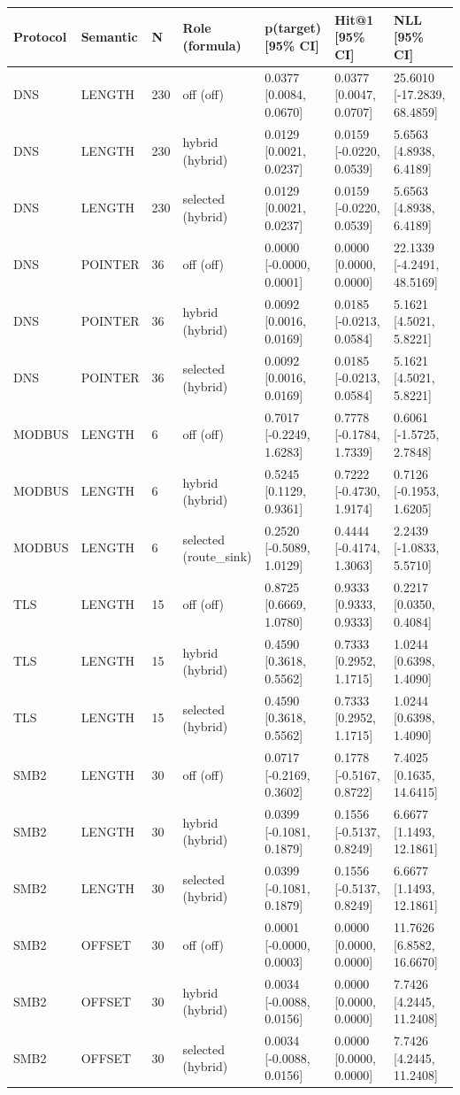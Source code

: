 \begin{tabular}{lllllll}
\hline
Protocol & Semantic & N & Role (formula) & p(target) [95\% CI] & Hit@1 [95\% CI] & NLL [95\% CI] \\
\hline
DNS & LENGTH & 230 & off (off) & 0.0377 [0.0084, 0.0670] & 0.0377 [0.0047, 0.0707] & 25.6010 [-17.2839, 68.4859] \\
DNS & LENGTH & 230 & hybrid (hybrid) & 0.0129 [0.0021, 0.0237] & 0.0159 [-0.0220, 0.0539] & 5.6563 [4.8938, 6.4189] \\
DNS & LENGTH & 230 & selected (hybrid) & 0.0129 [0.0021, 0.0237] & 0.0159 [-0.0220, 0.0539] & 5.6563 [4.8938, 6.4189] \\
DNS & POINTER & 36 & off (off) & 0.0000 [-0.0000, 0.0001] & 0.0000 [0.0000, 0.0000] & 22.1339 [-4.2491, 48.5169] \\
DNS & POINTER & 36 & hybrid (hybrid) & 0.0092 [0.0016, 0.0169] & 0.0185 [-0.0213, 0.0584] & 5.1621 [4.5021, 5.8221] \\
DNS & POINTER & 36 & selected (hybrid) & 0.0092 [0.0016, 0.0169] & 0.0185 [-0.0213, 0.0584] & 5.1621 [4.5021, 5.8221] \\
MODBUS & LENGTH & 6 & off (off) & 0.7017 [-0.2249, 1.6283] & 0.7778 [-0.1784, 1.7339] & 0.6061 [-1.5725, 2.7848] \\
MODBUS & LENGTH & 6 & hybrid (hybrid) & 0.5245 [0.1129, 0.9361] & 0.7222 [-0.4730, 1.9174] & 0.7126 [-0.1953, 1.6205] \\
MODBUS & LENGTH & 6 & selected (route\_sink) & 0.2520 [-0.5089, 1.0129] & 0.4444 [-0.4174, 1.3063] & 2.2439 [-1.0833, 5.5710] \\
TLS & LENGTH & 15 & off (off) & 0.8725 [0.6669, 1.0780] & 0.9333 [0.9333, 0.9333] & 0.2217 [0.0350, 0.4084] \\
TLS & LENGTH & 15 & hybrid (hybrid) & 0.4590 [0.3618, 0.5562] & 0.7333 [0.2952, 1.1715] & 1.0244 [0.6398, 1.4090] \\
TLS & LENGTH & 15 & selected (hybrid) & 0.4590 [0.3618, 0.5562] & 0.7333 [0.2952, 1.1715] & 1.0244 [0.6398, 1.4090] \\
SMB2 & LENGTH & 30 & off (off) & 0.0717 [-0.2169, 0.3602] & 0.1778 [-0.5167, 0.8722] & 7.4025 [0.1635, 14.6415] \\
SMB2 & LENGTH & 30 & hybrid (hybrid) & 0.0399 [-0.1081, 0.1879] & 0.1556 [-0.5137, 0.8249] & 6.6677 [1.1493, 12.1861] \\
SMB2 & LENGTH & 30 & selected (hybrid) & 0.0399 [-0.1081, 0.1879] & 0.1556 [-0.5137, 0.8249] & 6.6677 [1.1493, 12.1861] \\
SMB2 & OFFSET & 30 & off (off) & 0.0001 [-0.0000, 0.0003] & 0.0000 [0.0000, 0.0000] & 11.7626 [6.8582, 16.6670] \\
SMB2 & OFFSET & 30 & hybrid (hybrid) & 0.0034 [-0.0088, 0.0156] & 0.0000 [0.0000, 0.0000] & 7.7426 [4.2445, 11.2408] \\
SMB2 & OFFSET & 30 & selected (hybrid) & 0.0034 [-0.0088, 0.0156] & 0.0000 [0.0000, 0.0000] & 7.7426 [4.2445, 11.2408] \\
\hline
\end{tabular}
